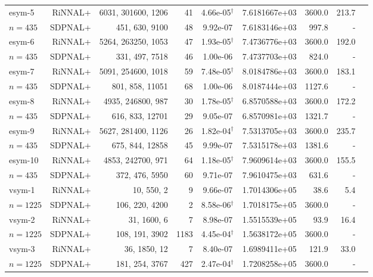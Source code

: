 \documentclass[11pt]{article}
\theoremstyle{plain}
\begin{document}
\begin{footnotesize}
\begin{longtable}[c]{lrrrccrrr}
esym-5& RiNNAL+ & 6031, 301600, 1206 & 41 & 4.66e-05$^{\dagger}$ & 7.6181667e+03 & 3600.0 &213.7 \\ 
$n=435$ & SDPNAL+ & 451, 630, 9100 & 48& 9.92e-07 & 7.6183146e+03 & 997.8 & - \\ [3pt] 

esym-6& RiNNAL+ & 5264, 263250, 1053 & 47 & 1.93e-05$^{\dagger}$ & 7.4736776e+03 & 3600.0 &192.0 \\ 
$n=435$ & SDPNAL+ & 331, 497, 7518 & 46& 1.00e-06 & 7.4737703e+03 & 824.0 & - \\ [3pt] 

esym-7& RiNNAL+ & 5091, 254600, 1018 & 59 & 7.48e-05$^{\dagger}$ & 8.0184786e+03 & 3600.0 &183.1 \\ 
$n=435$ & SDPNAL+ & 801, 858, 11051 & 68& 1.00e-06 & 8.0187444e+03 & 1127.6 & - \\ [3pt] 

esym-8& RiNNAL+ & 4935, 246800, 987 & 30 & 1.78e-05$^{\dagger}$ & 6.8570588e+03 & 3600.0 &172.2 \\ 
$n=435$ & SDPNAL+ & 616, 833, 12701 & 29& 9.05e-07 & 6.8570981e+03 & 1321.7 & - \\ [3pt] 

esym-9& RiNNAL+ & 5627, 281400, 1126 & 26 & 1.82e-04$^{\dagger}$ & 7.5313705e+03 & 3600.0 &235.7 \\ 
$n=435$ & SDPNAL+ & 675, 844, 12858 & 45& 9.99e-07 & 7.5315178e+03 & 1381.6 & - \\ [3pt] 

esym-10& RiNNAL+ & 4853, 242700, 971 & 64 & 1.18e-05$^{\dagger}$ & 7.9609614e+03 & 3600.0 &155.5 \\ 
$n=435$ & SDPNAL+ & 372, 476, 5950 & 60& 9.71e-07 & 7.9610475e+03 & 631.6 & - \\ [3pt] 

vsym-1& RiNNAL+ & 10, 550, 2 & 9 & 9.66e-07 & 1.7014306e+05 & 38.6 &5.4 \\ 
$n=1225$ & SDPNAL+ & 106, 220, 4200 & 2& 8.58e-06$^{\dagger}$ & 1.7018175e+05 & 3600.0 & - \\ [3pt] 

vsym-2& RiNNAL+ & 31, 1600, 6 & 7 & 8.98e-07 & 1.5515539e+05 & 93.9 &16.4 \\ 
$n=1225$ & SDPNAL+ & 108, 191, 3902 & 1183& 4.45e-04$^{\dagger}$ & 1.5638172e+05 & 3600.0 & - \\ [3pt] 

vsym-3& RiNNAL+ & 36, 1850, 12 & 7 & 8.40e-07 & 1.6989411e+05 & 121.9 &33.0 \\ 
$n=1225$ & SDPNAL+ & 181, 254, 3767 & 427& 2.47e-04$^{\dagger}$ & 1.7208258e+05 & 3600.0 & - \\ [3pt] 


\end{longtable}
\end{footnotesize}
\end{document}
